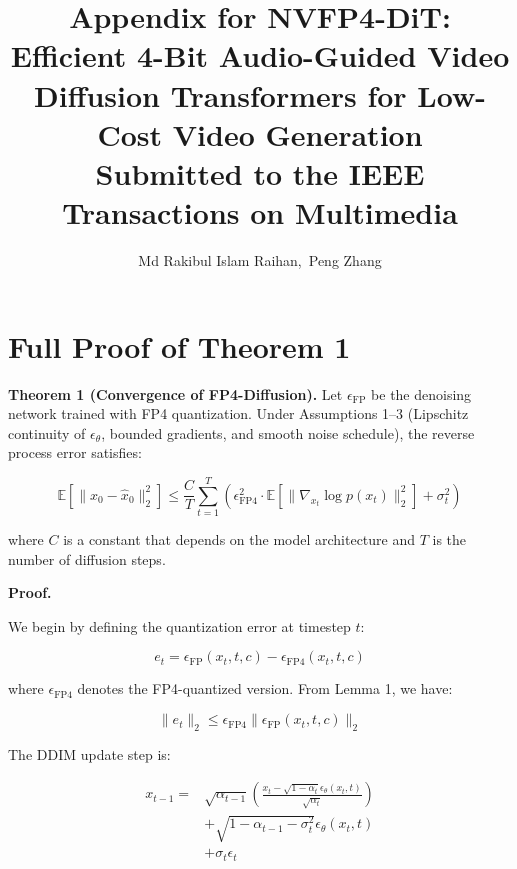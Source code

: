 \documentclass[journal,twoside]{IEEEtran}
\theoremstyle{definition}
\theoremstyle{remark}
\newcommand{\EE}{\mathbb{E}}
\begin{document}
\title{Appendix for NVFP4-DiT: Efficient 4-Bit Audio-Guided Video Diffusion Transformers for Low-Cost Video Generation \\ {\small Submitted to the IEEE Transactions on Multimedia}}

\author{Md Rakibul Islam Raihan,~Peng Zhang}

\maketitle

\appendices

\section{Full Proof of Theorem 1}
\label{app:a}

\textbf{Theorem 1 (Convergence of FP4-Diffusion).}
Let $\epsilon_{\text{FP}}$ be the denoising network trained with FP4 quantization. Under Assumptions 1--3 (Lipschitz continuity of $\epsilon_\theta$, bounded gradients, and smooth noise schedule), the reverse process error satisfies:

\[
\EE[\|x_0 - \hat{x}_0\|_2^2] \leq \frac{C}{T} \sum_{t=1}^T \left( \epsilon_{\text{FP4}}^2 \cdot \EE[\|\nabla_{x_t} \log p(x_t)\|_2^2] + \sigma_t^2 \right)
\]

where $C$ is a constant that depends on the model architecture and $T$ is the number of diffusion steps.

\textbf{Proof.}

We begin by defining the quantization error at timestep $t$:

\[
e_t = \epsilon_{\text{FP}}(x_t, t, c) - \epsilon_{\text{FP4}}(x_t, t, c)
\]

where $\epsilon_{\text{FP4}}$ denotes the FP4-quantized version. From Lemma 1, we have:

\[
\|e_t\|_2 \leq \epsilon_{\text{FP4}} \|\epsilon_{\text{FP}}(x_t, t, c)\|_2
\]

The DDIM update step is:

\begin{equation}
\begin{split}
x_{t-1} = &\sqrt{\alpha_{t-1}} \left( \frac{x_t - \sqrt{1-\alpha_t} \epsilon_\theta(x_t, t)}{\sqrt{\alpha_t}} \right) \\
&+ \sqrt{1-\alpha_{t-1} - \sigma_t^2} \epsilon_\theta(x_t, t) \\
&+ \sigma_t \epsilon_t
\end{split}
\end{equation}
\end{document}
